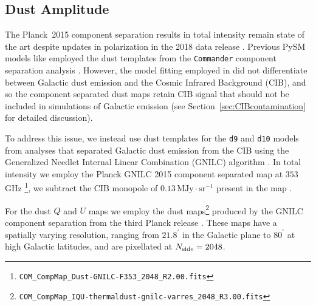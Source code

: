 \subsection{Dust Amplitude}\label{sec:dustamplitude}
The Planck~2015 component separation results in total intensity remain state of the art despite updates in polarization in the 2018 data release \citep{planck2016-l04}. Previous PySM models like  employed the dust templates from the \texttt{Commander} component separation analysis \citep{planck2014-a11}. However, the model fitting employed in \citet{planck2014-a11} did not differentiate between Galactic dust emission and the Cosmic Infrared Background (CIB), and so the component separated dust maps retain CIB signal that should not be included in simulations of Galactic emission (see Section~\ref{sec:CIBcontamination} for detailed discussion).

To address this issue, we instead use dust templates for the {\tt d9} and {\tt d10} models from analyses that separated Galactic dust emission from the CIB using the Generalized Needlet Internal Linear Combination (GNILC) algorithm \citep{2011MNRAS.418..467R}. In total intensity we employ the Planck GNILC 2015 component separated map at $353$\,GHz \citep{planck2016-XLVIII}\footnote{\texttt{COM\_CompMap\_Dust-GNILC-F353\_2048\_R2.00.fits}}, 
 we subtract the CIB monopole of $0.13\, \text{MJy}\cdot\text{sr}^{-1}$ present in the map \citep[][Section~2.2]{planck2016-l04}.

For the dust $Q$ and $U$ maps we employ the dust maps\footnote{\texttt{COM\_CompMap\_IQU-thermaldust-gnilc-varres\_2048\_R3.00.fits}} produced by the GNILC component separation from the third Planck release \citep{planck2016-l04,planck2016-l11B}. These maps have a spatially varying resolution, ranging from $21.8^\prime$ in the Galactic plane to $80^\prime$ at high Galactic latitudes, and are pixellated at $N_{\rm side} = 2048$. 

